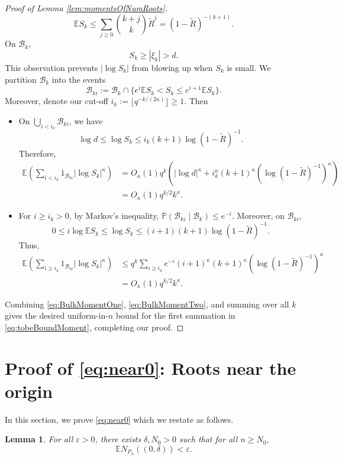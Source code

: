 \documentclass[12pt, reqno]{amsart}
\theoremstyle{plain}
\newtheorem{lemma}[theorem]{Lemma}
\theoremstyle{definition}
\renewcommand\P{{\mathbb{P}}}
\newcommand\E{{\mathbb{E}}}
\newcommand{\ep}{\varepsilon}
\begin{document}
\begin{proof}[Proof of Lemma \ref{lem:momentsOfNumRoots}]
\begin{equation*}
 \E S_k \le  \sum_{j \ge 0} \binom{k + j}{k} \tilde{R}^j =  (1 - \tilde{R})^{- (k + 1)}.
\end{equation*}
On $\mathcal B_k$, 
$$ S_k \ge |\xi_k|>d. $$ 
This observation prevents $|\log S_k|$ from blowing up when $S_k$ is small. We partition $\mathcal B_k$ into the events $$ \mathcal B_{ki} := \mathcal B_k \cap  \{e^i \E S_k < S_k \le e^{i +1} \E S_k\}. $$ 
Moreover, denote our cut-off $i_k := \lfloor q^{-k/(2\kappa)} \rfloor \ge 1$. Then 
\begin{itemize}
	\item On $\bigcup_{i < i_k} \mathcal B_{ki}$, we have 
	$$\log d\le \log S_k \le i_k (k + 1) \log (1 - \tilde R)^{-1}.$$
	Therefore,
	\begin{align}
		\E\left(\sum_{i < i_k} 1_{\mathcal B_{ki}} |\log S_k|^{\kappa}\right) &=O_\kappa(1) q^k \left( \left| \log d\right|^{\kappa} + i_k^{\kappa}(k + 1)^{\kappa} \left( \log(1 - \tilde R)^{-1} \right)^{\kappa} \right) \nonumber \\
		&=O_\kappa(1) q^{k/2} k^{\kappa}. \label{eq:BulkMomentOne}
	\end{align}
	
	\item For $i \ge i_k > 0$, by Markov's inequality, $\P(\mathcal B_{ki} \mid \mathcal B_k) \le e^{-i}$. Moreover, on $\mathcal B_{ki}$, $$ 0 \le i \log \E S_k \le \log S_k \le (i + 1) (k + 1) \log (1 - \tilde R)^{-1}.  $$ Thus, 
	\begin{align}
		\E\left(\sum_{i \ge i_k} 1_{\mathcal B_{ki}} |\log S_k|^{\kappa}\right) &\le q^k \sum_{i \ge i_k} e^{-i} (i + 1)^{\kappa} (k + 1)^{\kappa}   \left( \log(1 - \tilde R)^{-1} \right)^{\kappa} \nonumber \\
		&= O_\kappa(1) q^{k/2} k^{\kappa} . \label{eq:BulkMomentTwo}
	\end{align}
\end{itemize} 
Combining \eqref{eq:BulkMomentOne}, \eqref{eq:BulkMomentTwo}, and summing over all $k$ gives the desired uniform-in-$n$ bound for the first summation in \eqref{eq:tobeBoundMoment}, completing our proof.
\end{proof}



\section{Proof of \eqref{eq:near0}: Roots near the origin}\label{sec:ConvNear0}
In this section, we prove \eqref{eq:near0} which we restate as follows.
\begin{lemma}\label{lm:ConvNear0}
	For all $\ep > 0$, there exists $\delta, N_0 > 0$ such that for all $n \ge N_0$,
	\begin{equation*}
		\E N_{P_n}((0, \delta)) < \ep.
	\end{equation*}
\end{lemma}
\end{document}
